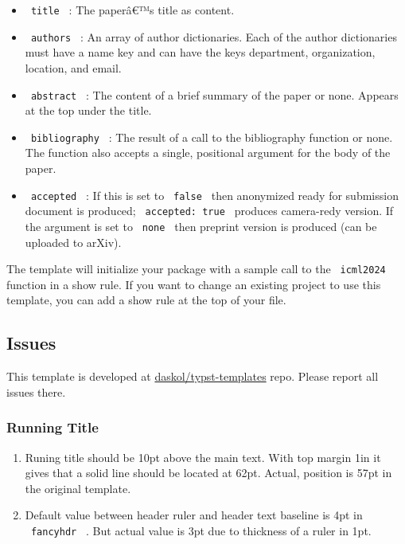 \begin{itemize}
\tightlist
\item
  \texttt{\ title\ } : The paperâ€™s title as content.
\item
  \texttt{\ authors\ } : An array of author dictionaries. Each of the
  author dictionaries must have a name key and can have the keys
  department, organization, location, and email.
\item
  \texttt{\ abstract\ } : The content of a brief summary of the paper or
  none. Appears at the top under the title.
\item
  \texttt{\ bibliography\ } : The result of a call to the bibliography
  function or none. The function also accepts a single, positional
  argument for the body of the paper.
\item
  \texttt{\ accepted\ } : If this is set to \texttt{\ false\ } then
  anonymized ready for submission document is produced;
  \texttt{\ accepted:\ true\ } produces camera-redy version. If the
  argument is set to \texttt{\ none\ } then preprint version is produced
  (can be uploaded to arXiv).
\end{itemize}

The template will initialize your package with a sample call to the
\texttt{\ icml2024\ } function in a show rule. If you want to change an
existing project to use this template, you can add a show rule at the
top of your file.

\subsection{Issues}\label{issues}

This template is developed at
\href{https://github.com/daskol/typst-templates}{daskol/typst-templates}
repo. Please report all issues there.

\subsubsection{Running Title}\label{running-title}

\begin{enumerate}
\tightlist
\item
  Runing title should be 10pt above the main text. With top margin 1in
  it gives that a solid line should be located at 62pt. Actual, position
  is 57pt in the original template.
\item
  Default value between header ruler and header text baseline is 4pt in
  \texttt{\ fancyhdr\ } . But actual value is 3pt due to thickness of a
  ruler in 1pt.
\end{enumerate}


